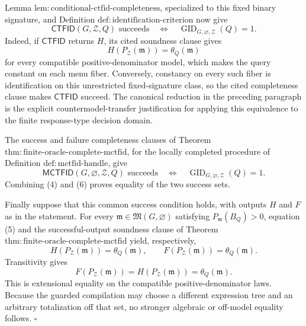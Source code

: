 Lemma \(\mathrm{lem:conditional\text{-}ctfid\text{-}completeness}\), specialized to this fixed binary signature, and Definition \(\mathrm{def:identification\text{-}criterion}\) now give
\[
 \mathsf{CTFID}(G,\mathcal Z,Q)\text{ succeeds}
 \quad\Longleftrightarrow\quad
 \operatorname{GID}_{G,\varnothing,\mathcal Z}(Q)=1.
\tag{4}
\]
Indeed, if \(\mathsf{CTFID}\) returns \(H\), its cited soundness clause gives
\[
 H(P_{\mathcal Z}(\mathfrak m))=\theta_Q(\mathfrak m)
\tag{5}
\]
for every compatible positive-denominator model, which makes the query constant on each menu fiber. Conversely, constancy on every such fiber is identification on this unrestricted fixed-signature class, so the cited completeness clause makes \(\mathsf{CTFID}\) succeed. The canonical reduction in the preceding paragraph is the explicit countermodel-transfer justification for applying this equivalence to the finite response-type decision domain.

The success and failure completeness clauses of Theorem \(\mathrm{thm:finite\text{-}oracle\text{-}complete\text{-}mctfid}\), for the locally completed procedure of Definition \(\mathrm{def:mctfid\text{-}handle}\), give
\[
 \mathsf{MCTFID}(G,\varnothing,\mathcal Z,Q)\text{ succeeds}
 \quad\Longleftrightarrow\quad
 \operatorname{GID}_{G,\varnothing,\mathcal Z}(Q)=1.
\tag{6}
\]
Combining (4) and (6) proves equality of the two success sets.

Finally suppose that this common success condition holds, with outputs \(H\) and \(F\) as in the statement. For every \(\mathfrak m\in\mathfrak M(G,\varnothing)\) satisfying \(P_{\mathfrak m}(B_Q)>0\), equation (5) and the successful-output soundness clause of Theorem \(\mathrm{thm:finite\text{-}oracle\text{-}complete\text{-}mctfid}\) yield, respectively,
\[
 H(P_{\mathcal Z}(\mathfrak m))=\theta_Q(\mathfrak m),
 \qquad
 F(P_{\mathcal Z}(\mathfrak m))=\theta_Q(\mathfrak m).
\]
Transitivity gives
\[
 F(P_{\mathcal Z}(\mathfrak m))
 =H(P_{\mathcal Z}(\mathfrak m))
 =\theta_Q(\mathfrak m).
\]
This is extensional equality on the compatible positive-denominator laws. Because the guarded compilation may choose a different expression tree and an arbitrary totalization off that set, no stronger algebraic or off-model equality follows. \(\square\)